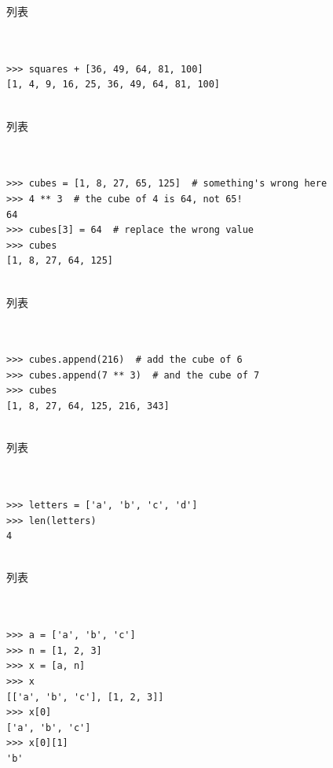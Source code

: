 \documentclass{beamer}
\begin{document}
\begin{frame}[t,fragile]{列表}


\begin{verbatim}


>>> squares + [36, 49, 64, 81, 100]
[1, 4, 9, 16, 25, 36, 49, 64, 81, 100]


\end{verbatim}


\end{frame}



\begin{frame}[t,fragile]{列表}


\begin{verbatim}


>>> cubes = [1, 8, 27, 65, 125]  # something's wrong here
>>> 4 ** 3  # the cube of 4 is 64, not 65!
64
>>> cubes[3] = 64  # replace the wrong value
>>> cubes
[1, 8, 27, 64, 125]


\end{verbatim}


\end{frame}




\begin{frame}[t,fragile]{列表}


\begin{verbatim}


>>> cubes.append(216)  # add the cube of 6
>>> cubes.append(7 ** 3)  # and the cube of 7
>>> cubes
[1, 8, 27, 64, 125, 216, 343]


\end{verbatim}


\end{frame}


\begin{frame}[t,fragile]{列表}


\begin{verbatim}


>>> letters = ['a', 'b', 'c', 'd']
>>> len(letters)
4


\end{verbatim}


\end{frame}


\begin{frame}[t,fragile]{列表}


\begin{verbatim}


>>> a = ['a', 'b', 'c']
>>> n = [1, 2, 3]
>>> x = [a, n]
>>> x
[['a', 'b', 'c'], [1, 2, 3]]
>>> x[0]
['a', 'b', 'c']
>>> x[0][1]
'b'


\end{verbatim}


\end{frame}
\end{document}
